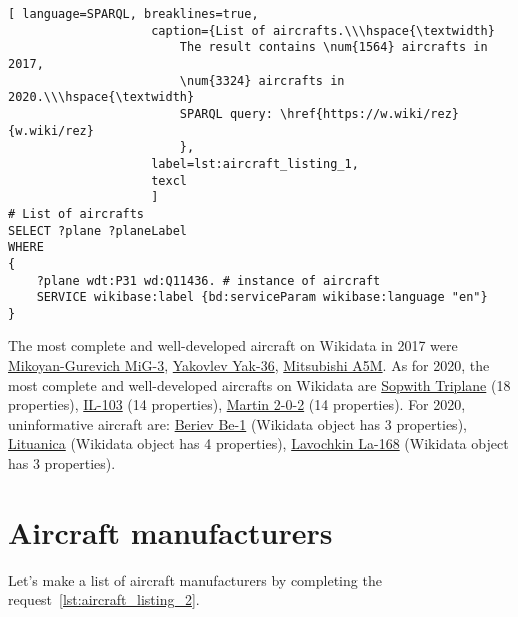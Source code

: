 \begin{lstlisting}[ language=SPARQL, breaklines=true, 
                    caption={List of aircrafts.\\\hspace{\textwidth}
                        The result contains \num{1564} aircrafts in 2017, 
                        \num{3324} aircrafts in 2020.\\\hspace{\textwidth}
                        SPARQL query: \href{https://w.wiki/rez}{w.wiki/rez}
                        },
                    label=lst:aircraft_listing_1,
                    texcl 
                    ]
# List of aircrafts
SELECT ?plane ?planeLabel
WHERE
{
    ?plane wdt:P31 wd:Q11436. # instance of aircraft
    SERVICE wikibase:label {bd:serviceParam wikibase:language "en"}
}
\end{lstlisting}

The most complete and well-developed aircraft on Wikidata in 2017 were \href{https://www.wikidata.org/wiki/Q271446}{Mikoyan-Gurevich MiG-3}, 
\href{https://www.wikidata.org/wiki/Q1349098}{Yakovlev Yak-36}, \href{https://www.wikidata.org/wiki/Q429839}{Mitsubishi A5M}. 
As for 2020, the most complete and well-developed aircrafts on Wikidata are \href{https://www.wikidata.org/wiki/Q770863}{Sopwith Triplane} (18 properties), 
\href{https://www.wikidata.org/wiki/Q1658673}{IL-103} (14 properties), \href{https://www.wikidata.org/wiki/Q665071}{Martin 2-0-2} (14 properties).
For 2020, uninformative aircraft are: \href{https://www.wikidata.org/wiki/Q820603}{Beriev Be-1} (Wikidata object has 3 properties), \href{https://www.wikidata.org/wiki/Q117984}{Lituanica} (Wikidata object has 4 properties), 
\href{https://www.wikidata.org/wiki/Q572762}{Lavochkin La-168} (Wikidata object has 3 properties).


\section{Aircraft manufacturers}

Let's make a list of aircraft manufacturers by completing the request~\ref{lst:aircraft_listing_2}.

